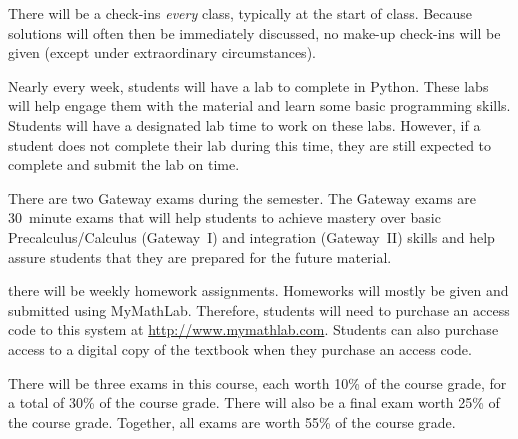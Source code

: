 \documentclass[11pt,letterpaper]{article}
\begin{document}
There will be a check-ins \textit{every} class, typically at the start of class. Because solutions will often then be immediately discussed, no make-up check-ins will be given (except under extraordinary circumstances). \pspace


Nearly every week, students will have a lab to complete in Python. These labs will help engage them with the material and learn some basic programming skills. Students will have a designated lab time to work on these labs. However, if a student does not complete their lab during this time, they are still expected to complete and submit the lab on time.
\pspace


There are two Gateway exams during the semester. The Gateway exams are 30~minute exams that will help students to achieve mastery over basic Precalculus/Calculus (Gateway~I) and integration (Gateway~II) skills and help assure students that they are prepared for the future material. 
\pspace



\newpage



there will be weekly homework assignments. Homeworks will mostly be given and submitted using MyMathLab. Therefore, students will need to purchase an access code to this system at \url{http://www.mymathlab.com}. Students can also purchase access to a digital copy of the textbook when they purchase an access code.
\pspace


There will be three exams in this course, each worth 10\% of the course grade, for a total of 30\% of the course grade. There will also be a final exam worth 25\% of the course grade. Together, all exams are worth 55\% of the course grade. 
\pspace
\end{document}
